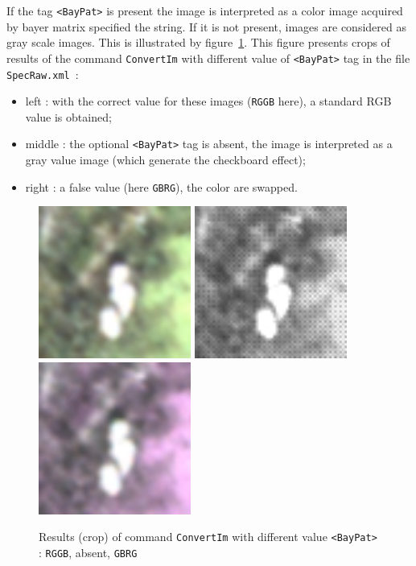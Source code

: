 If the tag {\tt <BayPat>} is present the image is interpreted as a color image acquired by bayer matrix
specified the string. If it is not present, images are considered  as gray scale images. This is
illustrated by figure~\ref{FIG:RawBayer}. This figure presents crops of results of the command
{\tt ConvertIm} with different value of {\tt <BayPat>} tag in the file {\tt  SpecRaw.xml}~:


\begin{itemize}
       \item left : with the correct value for these images ({\tt RGGB} here), a standard RGB value
             is obtained;

       \item middle : the optional {\tt <BayPat>} tag is absent, the image is interpreted as a gray value
             image (which generate the checkboard effect);

       \item right : a false value (here  {\tt GBRG}), the color are swapped.
\end{itemize}

\begin{figure}
\begin{center}
\includegraphics[width=50mm]{FIGS/RawImages/Coul.jpg}
\includegraphics[width=50mm]{FIGS/RawImages/Gray.jpg}
\includegraphics[width=50mm]{FIGS/RawImages/CoulBuged.jpg}
\end{center}
\caption{Results (crop) of command {\tt ConvertIm} with different value {\tt <BayPat>} : {\tt RGGB}, absent, {\tt GBRG}   }
\label{FIG:RawBayer}
\end{figure}


